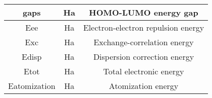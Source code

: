 \documentclass{article}
\begin{document}
\begin{center}
\begin{tabular}{||c c c||}
    \hline gaps    &              Ha     &     	HOMO-LUMO energy gap     \\
    \hline  Eee   &             Ha      &     Electron-electron repulsion energy     \\
    \hline Exc    &               Ha     &     Exchange-correlation energy     \\
    \hline Edisp    &            Ha      &    	Dispersion correction energy      \\
    \hline Etot    &               Ha    &    Total electronic energy      \\
    \hline   Eatomization  &      Ha     &     Atomization energy     \\ 
    \hline

    \end{tabular}
\end{center}
\end{document}
